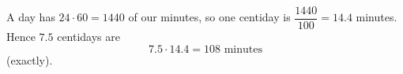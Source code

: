 A day has $24\cdot60=1440$ of our minutes, so one centiday is $\dfrac{1440}{100}=14.4$ minutes. Hence $7.5$ centidays are
\[
7.5\cdot14.4=\boxed{108\text{ minutes}}
\]
(exactly).
